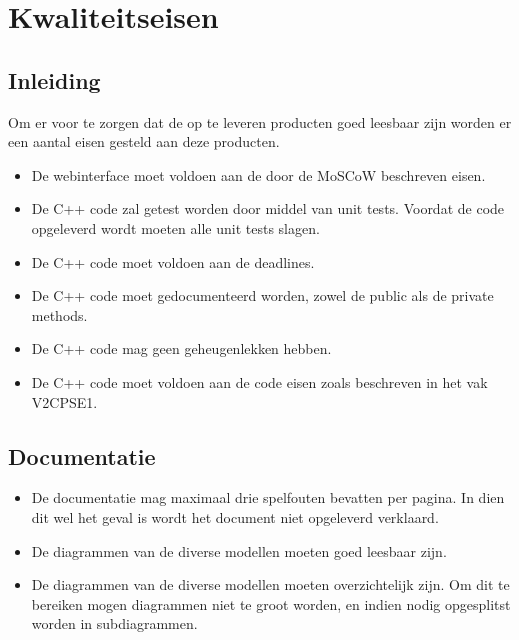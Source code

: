 \chapter{Kwaliteitseisen}
\section{Inleiding}
Om er voor te zorgen dat de op te leveren producten goed leesbaar zijn worden er een aantal eisen gesteld aan deze producten.

\begin{itemize}
\section{Software}
	\item De webinterface moet voldoen aan de door de MoSCoW beschreven eisen.
	\item De C++ code zal getest worden door middel van unit tests. Voordat de code opgeleverd wordt moeten alle unit tests slagen.
	\item De C++ code moet voldoen aan de deadlines.
	\item De C++ code moet gedocumenteerd worden, zowel de public als de private methods.
	\item De C++ code mag geen geheugenlekken hebben.
	\item De C++ code moet voldoen aan de code eisen zoals beschreven in het vak V2CPSE1.
\end{itemize}

\section{Documentatie}
\begin{itemize}
	\item De documentatie mag maximaal drie spelfouten bevatten per pagina. In dien dit wel het geval is wordt het document niet opgeleverd verklaard.
	\item De diagrammen van de diverse modellen moeten goed leesbaar zijn. 
	\item De diagrammen van de diverse modellen moeten overzichtelijk zijn. Om dit te bereiken mogen diagrammen niet te groot worden, en indien nodig opgesplitst worden in subdiagrammen.
\end{itemize}
